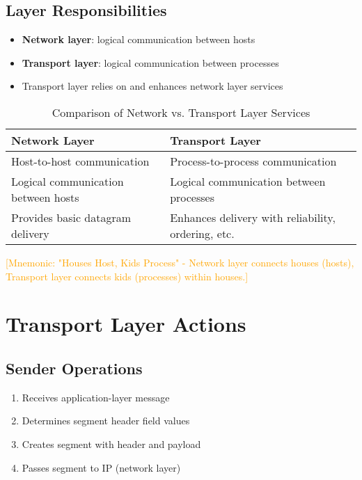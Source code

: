 \documentclass[12pt]{article}
\begin{document}
\subsection{Layer Responsibilities}
\begin{itemize}
    \item \textbf{Network layer}: logical communication between hosts
    \item \textbf{Transport layer}: logical communication between processes
    \item Transport layer relies on and enhances network layer services
\end{itemize}

\begin{table}[h]
    \centering
    \begin{tabular}{p{}p{}}
        \toprule
        \textbf{Network Layer}              & \textbf{Transport Layer}                           \\
        \midrule
        Host-to-host communication          & Process-to-process communication                   \\
        Logical communication between hosts & Logical communication between processes            \\
        Provides basic datagram delivery    & Enhances delivery with reliability, ordering, etc. \\
        \bottomrule
    \end{tabular}
    \caption{Comparison of Network vs. Transport Layer Services}
    \label{tab:network_vs_transport}
\end{table}

\textcolor{orange}{[Mnemonic: "Houses Host, Kids Process" - Network layer connects houses (hosts), Transport layer connects kids (processes) within houses.]}

\section{Transport Layer Actions}

\subsection{Sender Operations}
\begin{enumerate}
    \item Receives application-layer message
    \item Determines segment header field values
    \item Creates segment with header and payload
    \item Passes segment to IP (network layer)
\end{enumerate}
\end{document}
